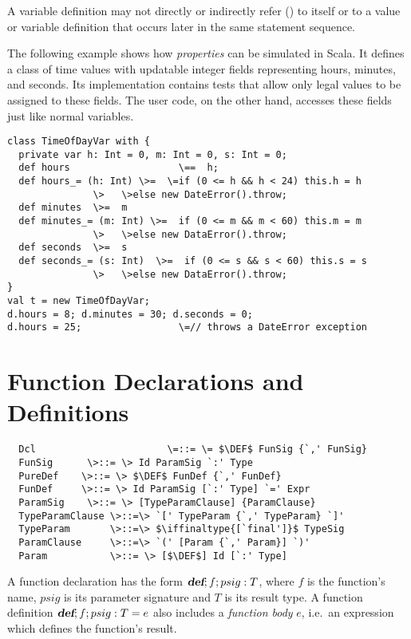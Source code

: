 \documentclass[11pt]{report}
\newcommand{\iffinaltype}[1]{}
\begin{document}
A variable definition may not directly or indirectly refer
() to itself or to a value or variable definition
that occurs later in the same statement sequence.

\example The following example shows how {\em properties} can be
simulated in Scala. It defines a class \verb@TimeOfDayVar@ of time
values with updatable integer fields representing hours, minutes, and
seconds. Its implementation contains tests that allow only legal
values to be assigned to these fields. The user code, on the other
hand, accesses these fields just like normal variables.

\begin{verbatim}
class TimeOfDayVar with {
  private var h: Int = 0, m: Int = 0, s: Int = 0;
  def hours                   \==  h;
  def hours_= (h: Int) \>=  \=if (0 <= h && h < 24) this.h = h
		       \>   \>else new DateError().throw;
  def minutes  \>=  m
  def minutes_= (m: Int) \>=  if (0 <= m && m < 60) this.m = m
		       \>   \>else new DataError().throw;
  def seconds  \>=  s
  def seconds_= (s: Int)  \>=  if (0 <= s && s < 60) this.s = s
		       \>   \>else new DataError().throw;
}
val t = new TimeOfDayVar;
d.hours = 8; d.minutes = 30; d.seconds = 0;
d.hours = 25;                 \=// throws a DateError exception
\end{verbatim}

\section{Function Declarations and Definitions}
\label{sec:defdef}
\label{sec:funsigs}

\syntax\begin{verbatim}
  Dcl                       \=::= \= $\DEF$ FunSig {`,' FunSig}
  FunSig      \>::= \> Id ParamSig `:' Type
  PureDef    \>::= \> $\DEF$ FunDef {`,' FunDef}
  FunDef     \>::= \> Id ParamSig [`:' Type] `=' Expr
  ParamSig    \>::= \> [TypeParamClause] {ParamClause}
  TypeParamClause \>::=\> `[' TypeParam {`,' TypeParam} `]'
  TypeParam       \>::=\> $\iffinaltype{[`final']}$ TypeSig
  ParamClause     \>::=\> `(' [Param {`,' Param}] `)'
  Param        	  \>::= \> [$\DEF$] Id [`:' Type]
\end{verbatim}

A function declaration has the form $\mbox{\sl\bfseries def};f;psig: T$, where $f$ is the
function's name, $psig$ is its parameter signature and $T$ is its
result type. A function definition $\mbox{\sl\bfseries def};f;psig:T = e$ also includes a
{\em function body} $e$, i.e.\ an expression which defines the
function's result.
\end{document}
